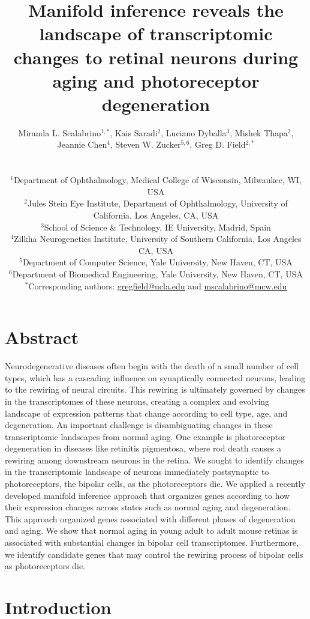 \documentclass[11pt, a4paper]{article}
\title{Manifold inference reveals the landscape of transcriptomic changes to retinal neurons during aging and photoreceptor degeneration}
\author{
  Miranda L. Scalabrino$^{1,*}$, Kais Saradi$^{2}$, Luciano Dyballa$^{3}$, Mishek Thapa$^{2}$,\\ Jeannie Chen$^{4}$, Steven W. Zucker$^{5,6}$, Greg D. Field$^{2,*}$ \\
  \\
  \begin{minipage}{\textwidth}
  \raggedright
  \small $^{1}$Department of Ophthalmology, Medical College of Wisconsin, Milwaukee, WI, USA \\
  \small $^{2}$Jules Stein Eye Institute, Department of Ophthalmology, University of California, Los Angeles, CA, USA \\
  \small $^{3}$School of Science \& Technology, IE University, Madrid, Spain \\
  \small $^{4}$Zilkha Neurogenetics Institute, University of Southern California, Los Angeles CA, USA \\
  \small $^{5}$Department of Computer Science, Yale University, New Haven, CT, USA \\
  \small $^{6}$Department of Biomedical Engineering, Yale University, New Haven, CT, USA \\
  \small $^{*}$Corresponding authors: \href{mailto:gregfield@ucla.edu} {gregfield@ucla.edu} and \href{mailto:mscalabrino@mcw.edu}{mscalabrino@mcw.edu}
  \end{minipage}
}
\begin{document}
\maketitle

\section*{Abstract}
Neurodegenerative diseases often begin with the death of a small number of cell types, which has a cascading influence on synaptically connected neurons, leading to the rewiring of neural circuits. This rewiring is ultimately governed by changes in the transcriptomes of these neurons, creating a complex and evolving landscape of expression patterns that change according to cell type, age, and degeneration. An important challenge is disambiguating changes in these transcriptomic landscapes from normal aging. One example is photoreceptor degeneration in diseases like retinitis pigmentosa, where rod death causes a rewiring among downstream neurons in the retina. We sought to identify changes in the transcriptomic landscape of neurons immediately postsynaptic to photoreceptors, the bipolar cells, as the photoreceptors die. We applied a recently developed manifold inference approach that organizes genes according to how their expression changes across states such as normal aging and degeneration.  This approach organized genes associated with different phases of degeneration and aging.  We show that normal aging in young adult to adult mouse retinas is associated with substantial changes in bipolar cell transcriptomes. Furthermore, we identify candidate genes that may control the rewiring process of bipolar cells as photoreceptors die. 

\vspace{1cm}

\section*{Introduction}
\end{document}
